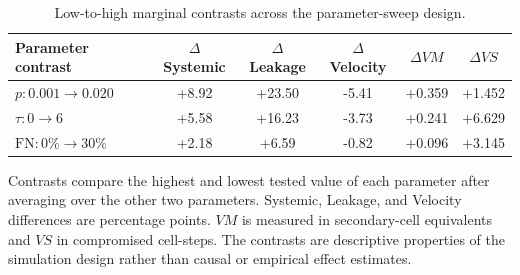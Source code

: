 \begin{table}[t]
\centering
\caption{Low-to-high marginal contrasts across the parameter-sweep design.}
\label{tab:marginal-contrasts}
\begin{tabular}{lccccc}
\hline
Parameter contrast & $\Delta$Systemic & $\Delta$Leakage & $\Delta$Velocity & $\Delta VM$ & $\Delta VS$ \\
\hline
$p: 0.001\rightarrow0.020$ & +8.92 & +23.50 & -5.41 & +0.359 & +1.452 \\
$\tau: 0\rightarrow6$ & +5.58 & +16.23 & -3.73 & +0.241 & +6.629 \\
$\mathrm{FN}: 0\%\rightarrow30\%$ & +2.18 & +6.59 & -0.82 & +0.096 & +3.145 \\
\hline
\end{tabular}
\begin{flushleft}
\footnotesize
Contrasts compare the highest and lowest tested value of each parameter after averaging over the other two parameters. Systemic, Leakage, and Velocity differences are percentage points. $VM$ is measured in secondary-cell equivalents and $VS$ in compromised cell-steps. The contrasts are descriptive properties of the simulation design rather than causal or empirical effect estimates.
\end{flushleft}
\end{table}
